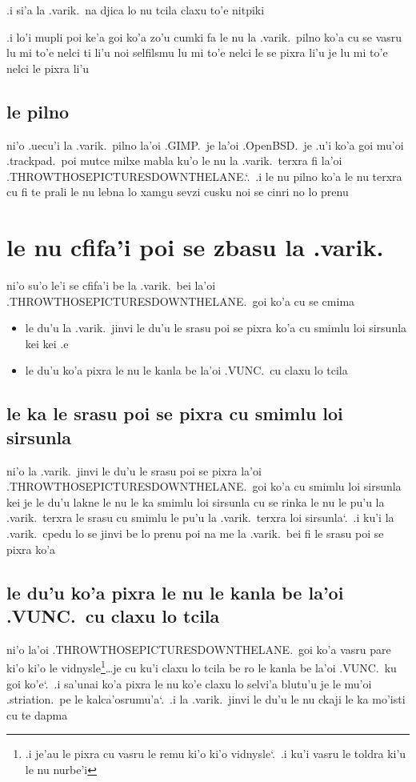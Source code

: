 \documentclass{report}
\newcommand\sds{\spacefactor\sfcode`.\ \space}
\begin{document}
.i si'a la .varik.\ na djica lo nu tcila claxu to'e nitpiki

.i lo'i mupli poi ke'a goi ko'a zo'u cumki fa le nu la .varik.\ pilno ko'a cu se vasru lu mi to'e nelci ti li'u noi selfilsmu lu mi to'e nelci le se pixra li'u je lu mi to'e nelci le pixra li'u

\subsection{le pilno}
ni'o .uecu'i la .varik.\ pilno la'oi .GIMP.\ je la'oi .OpenBSD.\ je .u'i ko'a goi mu'oi .trackpad.\ poi mutce milxe mabla ku'o le nu la .varik.\ terxra fi la'oi .THROWTHOSEPICTURESDOWNTHELANE.\sds  .i le nu pilno ko'a le nu terxra cu fi te prali le nu lebna lo xamgu sevzi cusku noi se cinri no lo prenu

\section{le nu cfifa'i poi se zbasu la .varik.}
ni'o su'o le'i se cfifa'i be la .varik.\ bei la'oi .THROWTHOSEPICTURESDOWNTHELANE.\ goi ko'a cu se cmima
\begin{itemize}
	\item le du'u la .varik.\ jinvi le du'u le srasu poi se pixra ko'a cu smimlu loi sirsunla kei kei .e
	\item le du'u ko'a pixra le nu le kanla be la'oi .VUNC.\ cu claxu lo tcila
\end{itemize}

\subsection{le ka le srasu poi se pixra cu smimlu loi sirsunla}
ni'o la .varik.\ jinvi le du'u le srasu poi se pixra la'oi .THROWTHOSEPICTURESDOWNTHELANE.\ goi ko'a cu smimlu loi sirsunla kei je le du'u lakne le nu le ka smimlu loi sirsunla cu se rinka le nu le pu'u la .varik.\ terxra le srasu cu smimlu le pu'u la .varik.\ terxra loi sirsunla\sds  .i ku'i la .varik.\ cpedu lo se jinvi be lo prenu poi na me la .varik.\ bei fi le srasu poi se pixra ko'a

\subsection{le du'u ko'a pixra le nu le kanla be la'oi .VUNC.\ cu claxu lo tcila}
ni'o la'oi .THROWTHOSEPICTURESDOWNTHELANE.\ goi ko'a vasru pare ki'o ki'o le vidnysle\footnote{.i je'au le pixra cu vasru le remu ki'o ki'o vidnysle\sds  .i ku'i vasru le toldra ki'u le nu nurbe'i}\ldots je cu ku'i claxu lo tcila be ro le kanla be la'oi .VUNC.\ ku goi ko'e\sds  .i sa'unai ko'a pixra le nu ko'e claxu lo selvi'a blutu'u je le mu'oi .striation.\ pe le kalca'osrumu'a\sds  .i la .varik.\ jinvi le du'u le nu ckaji le ka mo'isti cu te dapma
\end{document}
